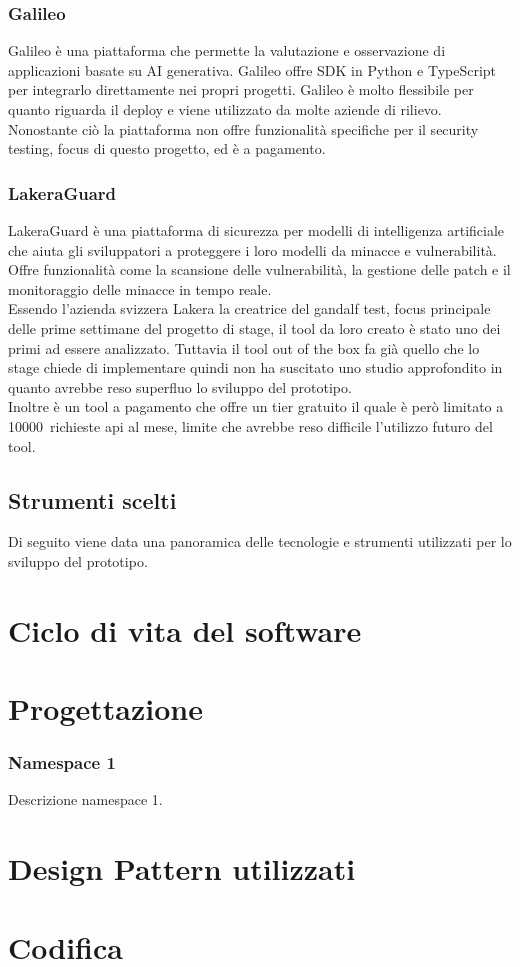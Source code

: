 \subsubsection*{Galileo}
Galileo è una piattaforma che permette la valutazione e osservazione di applicazioni basate su AI generativa. Galileo offre SDK in Python e TypeScript per integrarlo direttamente nei propri progetti. Galileo è molto flessibile per quanto riguarda il deploy e viene utilizzato da molte aziende di rilievo. Nonostante ciò la piattaforma non offre funzionalità specifiche per il security testing, focus di questo progetto, ed è a pagamento.

\subsubsection*{LakeraGuard}
LakeraGuard è una piattaforma di sicurezza per modelli di intelligenza artificiale che aiuta gli sviluppatori a proteggere i loro modelli da minacce e vulnerabilità. Offre funzionalità come la scansione delle vulnerabilità, la gestione delle patch e il monitoraggio delle minacce in tempo reale.\\
Essendo l'azienda svizzera Lakera la creatrice del gandalf test, focus principale delle prime settimane del progetto di stage, il tool da loro creato è stato uno dei primi ad essere analizzato. 
Tuttavia il tool out of the box fa già quello che lo stage chiede di implementare quindi non ha suscitato uno studio approfondito in quanto avrebbe reso superfluo lo sviluppo del prototipo.\\
Inoltre è un tool a pagamento che offre un tier gratuito il quale è però limitato a 10000~richieste \gls{api} al mese, limite che avrebbe reso difficile l'utilizzo futuro del tool.


\subsection{Strumenti scelti}
Di seguito viene data una panoramica delle tecnologie e strumenti utilizzati per lo sviluppo del prototipo.


\section{Ciclo di vita del software}
\label{sec:ciclo-vita-software}

\section{Progettazione}
\label{sec:progettazione}

\subsubsection{Namespace 1} %
Descrizione namespace 1.

\begin{namespacedesc}
\end{namespacedesc}


\section{Design Pattern utilizzati}

\section{Codifica}
